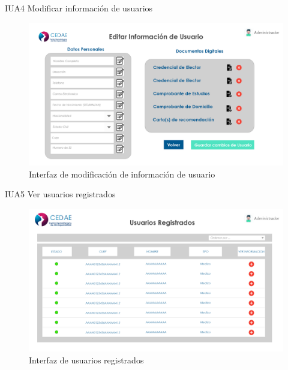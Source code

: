\documentclass[12pt,letterpaper]{article}
\begin{document}
        IUA4 Modificar información de usuarios
            \begin{figure}[H]
                \centering
                \includegraphics [scale=0.2]{interfaces/adm_mod_info}
                \caption{Interfaz de modificación de información de usuario}
            \end{figure}
        IUA5 Ver usuarios registrados
            \begin{figure}[H]
                \centering
                \includegraphics [scale=0.2]{interfaces/adm_ver_usuario}
                \caption{Interfaz de usuarios registrados}
            \end{figure}
\end{document}
